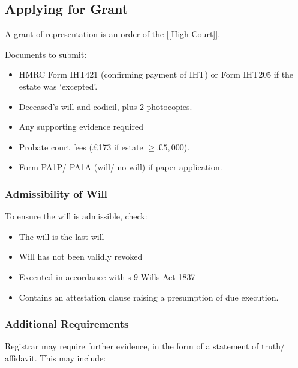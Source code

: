 \documentclass[
]{article}
\providecommand{\tightlist}{%
  \setlength{\itemsep}{0pt}\setlength{\parskip}{0pt}}
\begin{document}
\hypertarget{applying-for-grant}{%
\subsection{Applying for Grant}\label{applying-for-grant}}

A grant of representation is an order of the {[}{[}High Court{]}{]}.

Documents to submit:

\begin{itemize}
\tightlist
\item
  HMRC Form IHT421 (confirming payment of IHT) or Form IHT205 if the
  estate was `excepted'.
\item
  Deceased's will and codicil, plus 2 photocopies.
\item
  Any supporting evidence required
\item
  Probate court fees (£173 if estate \(\geq £5,000\)).
\item
  Form PA1P/ PA1A (will/ no will) if paper application.
\end{itemize}

\hypertarget{admissibility-of-will}{%
\subsubsection{Admissibility of Will}\label{admissibility-of-will}}

To ensure the will is admissible, check:

\begin{itemize}
\tightlist
\item
  The will is the last will
\item
  Will has not been validly revoked
\item
  Executed in accordance with s 9 Wills Act 1837
\item
  Contains an attestation clause raising a presumption of due execution.
\end{itemize}

\hypertarget{additional-requirements}{%
\subsubsection{Additional Requirements}\label{additional-requirements}}

Registrar may require further evidence, in the form of a statement of
truth/ affidavit. This may include:
\end{document}
